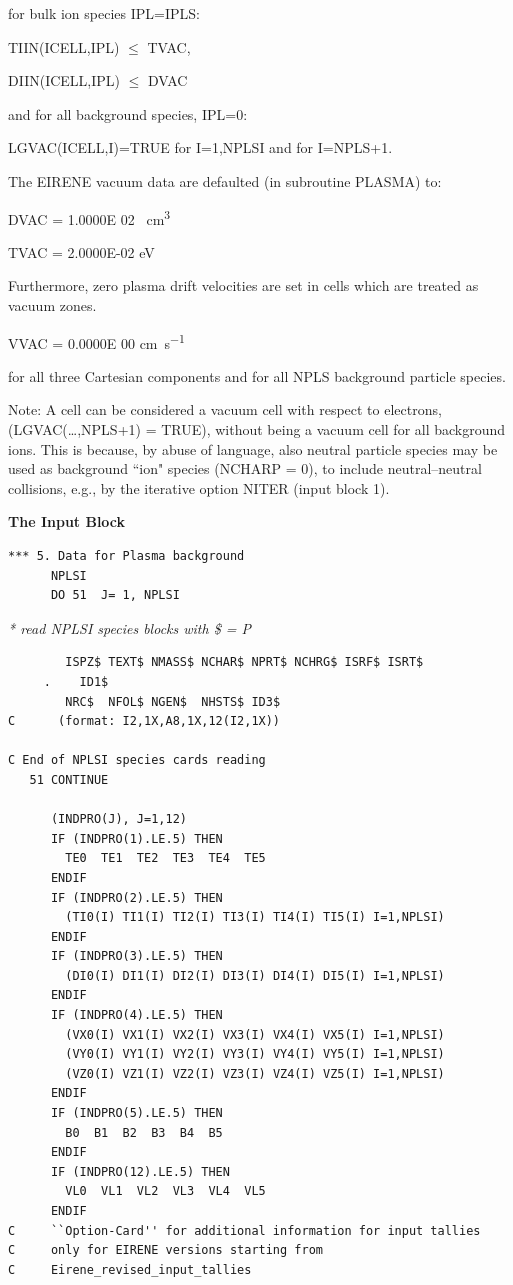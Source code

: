 for bulk ion species IPL=IPLS:

TIIN(ICELL,IPL) $\le$ TVAC, 

DIIN(ICELL,IPL) $\le$ DVAC 

and for all background species, IPL=0:

LGVAC(ICELL,I)=TRUE for I=1,NPLSI and for I=NPLS+1.

The EIRENE vacuum data are defaulted (in subroutine PLASMA) to:

DVAC = 1.0000E 02 \si{\per\cubic\centi\metre} 

TVAC = 2.0000E-02 \si{\electronvolt} 

Furthermore, zero plasma drift velocities are set in cells which are treated as
vacuum zones.

VVAC = 0.0000E 00  \si{\centi\metre\per\second} 

for all three Cartesian components and for all NPLS background particle
species.

Note: A cell can be considered a vacuum cell with respect to electrons,
(LGVAC(\dots,NPLS+1) = TRUE), without being a vacuum cell for all background
ions.
This is because, by abuse of language, also neutral particle species may be
used as background ``ion" species (NCHARP = 0), to include neutral--neutral
collisions, e.g., by the iterative option NITER (input block 1).

\medskip

\textbf{The Input Block} 

\begin{lstlisting}
*** 5. Data for Plasma background
      NPLSI
      DO 51  J= 1, NPLSI
\end{lstlisting} 

\textsl{* read NPLSI species blocks with \$ = P} 

\begin{lstlisting}
        ISPZ$ TEXT$ NMASS$ NCHAR$ NPRT$ NCHRG$ ISRF$ ISRT$ 
     .    ID1$
        NRC$  NFOL$ NGEN$  NHSTS$ ID3$
C      (format: I2,1X,A8,1X,12(I2,1X))

C End of NPLSI species cards reading
   51 CONTINUE

      (INDPRO(J), J=1,12)
      IF (INDPRO(1).LE.5) THEN
        TE0  TE1  TE2  TE3  TE4  TE5
      ENDIF
      IF (INDPRO(2).LE.5) THEN
        (TI0(I) TI1(I) TI2(I) TI3(I) TI4(I) TI5(I) I=1,NPLSI)
      ENDIF
      IF (INDPRO(3).LE.5) THEN
        (DI0(I) DI1(I) DI2(I) DI3(I) DI4(I) DI5(I) I=1,NPLSI)
      ENDIF
      IF (INDPRO(4).LE.5) THEN
        (VX0(I) VX1(I) VX2(I) VX3(I) VX4(I) VX5(I) I=1,NPLSI)
        (VY0(I) VY1(I) VY2(I) VY3(I) VY4(I) VY5(I) I=1,NPLSI)
        (VZ0(I) VZ1(I) VZ2(I) VZ3(I) VZ4(I) VZ5(I) I=1,NPLSI)
      ENDIF
      IF (INDPRO(5).LE.5) THEN
        B0  B1  B2  B3  B4  B5
      ENDIF
      IF (INDPRO(12).LE.5) THEN
        VL0  VL1  VL2  VL3  VL4  VL5
      ENDIF
C     ``Option-Card'' for additional information for input tallies
C     only for EIRENE versions starting from
C     Eirene_revised_input_tallies
\end{lstlisting} 

